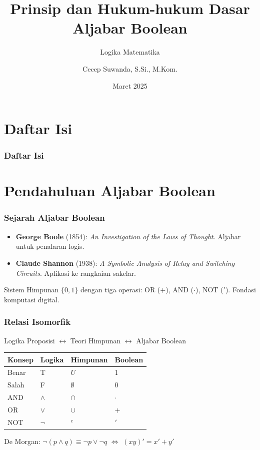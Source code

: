\documentclass[handout]{beamer}
\subtitle[Logika Matematika]{Logika Matematika}
\title[Aljabar Boolean]{Prinsip dan Hukum-hukum Dasar Aljabar Boolean}
\author{Cecep Suwanda, S.Si., M.Kom.}
\date{Maret 2025}
\institute{Universitas Bale Bandung}
\theoremstyle{definition}
\theoremstyle{example}
\begin{document}
\maketitle

\section*{Daftar Isi}
\begin{frame}
\frametitle{Daftar Isi}
\tableofcontents
\end{frame}

\section{Pendahuluan Aljabar Boolean}

\begin{frame}
\frametitle{Sejarah Aljabar Boolean}
\begin{itemize}
  \item \textbf{George Boole} (1854): \textit{An Investigation of the Laws of Thought}. Aljabar untuk penalaran logis.
  \item \textbf{Claude Shannon} (1938): \textit{A Symbolic Analysis of Relay and Switching Circuits}. Aplikasi ke rangkaian sakelar.
\end{itemize}
\begin{block}{Sistem}
Himpunan $\{0, 1\}$ dengan tiga operasi: OR ($+$), AND ($\cdot$), NOT ($'$). Fondasi komputasi digital.
\end{block}
\end{frame}

\begin{frame}
\frametitle{Relasi Isomorfik}
Logika Proposisi $\leftrightarrow$ Teori Himpunan $\leftrightarrow$ Aljabar Boolean
\begin{center}
\small
\begin{tabular}{|l|l|l|l|}
\hline
\textbf{Konsep} & \textbf{Logika} & \textbf{Himpunan} & \textbf{Boolean} \\ \hline
Benar & T & $U$ & 1 \\ \hline
Salah & F & $\emptyset$ & 0 \\ \hline
AND & $\wedge$ & $\cap$ & $\cdot$ \\ \hline
OR & $\vee$ & $\cup$ & $+$ \\ \hline
NOT & $\neg$ & $^c$ & $'$ \\ \hline
\end{tabular}
\end{center}
De Morgan: $\neg(p \wedge q) \equiv \neg p \vee \neg q$ $\Leftrightarrow$ $(xy)' = x' + y'$
\end{frame}
\end{document}
